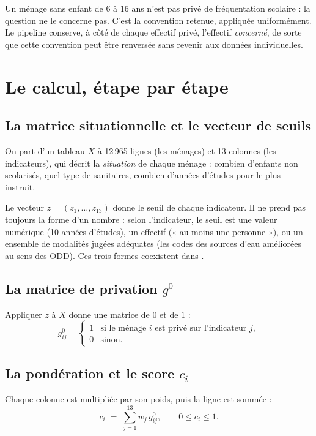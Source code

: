 \documentclass[11pt,a4paper]{article}
\begin{document}
\begin{retenir}
Un ménage sans enfant de 6 à 16 ans n'est pas privé de fréquentation scolaire : la question ne le
concerne pas. C'est la convention retenue, appliquée uniformément. Le pipeline conserve, à côté de
chaque effectif privé, l'effectif \emph{concerné}, de sorte que cette convention peut être
renversée sans revenir aux données individuelles.
\end{retenir}

\section{Le calcul, étape par étape}

\subsection{La matrice situationnelle et le vecteur de seuils}

On part d'un tableau $X$ à 12\,965 lignes (les ménages) et 13 colonnes (les indicateurs), qui
décrit la \emph{situation} de chaque ménage : combien d'enfants non scolarisés, quel type de
sanitaires, combien d'années d'études pour le plus instruit.

Le vecteur $z = (z_1, \dots, z_{13})$ donne le seuil de chaque indicateur. Il ne prend pas
toujours la forme d'un nombre : selon l'indicateur, le seuil est une valeur numérique (10 années
d'études), un effectif (« au moins une personne »), ou un ensemble de modalités jugées adéquates
(les codes des sources d'eau améliorées au sens des ODD). Ces trois formes coexistent dans
.

\subsection{La matrice de privation $g^0$}

Appliquer $z$ à $X$ donne une matrice de $0$ et de $1$ :
\[
g^0_{ij} =
\begin{cases}
1 & \text{si le ménage } i \text{ est privé sur l'indicateur } j,\\
0 & \text{sinon.}
\end{cases}
\]

\subsection{La pondération et le score $c_i$}

Chaque colonne est multipliée par son poids, puis la ligne est sommée :
\[
c_i \;=\; \sum_{j=1}^{13} w_j \, g^0_{ij}, \qquad 0 \le c_i \le 1 .
\]
\end{document}
